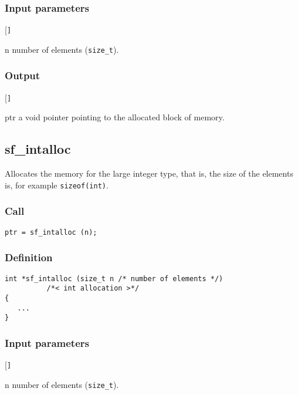 \subsubsection*{Input parameters}
\begin{desclist}{\tt }{\quad}[\tt ]
   \setlength\itemsep{0pt}
   \item[n]  number of elements (\texttt{size\_t}).
\end{desclist}

\subsubsection*{Output}
\begin{desclist}{\tt }{\quad}[\tt ]
   \setlength\itemsep{0pt}
   \item[ptr] a void pointer pointing to the allocated block of memory.
\end{desclist}




\subsection{{sf\_intalloc}}\label{sec:sf_intalloc}
Allocates the memory for  the large integer type, that is,  the size of the elements is, for example \texttt{sizeof(int)}. 

\subsubsection*{Call}
\begin{verbatim}ptr = sf_intalloc (n);\end{verbatim}

\subsubsection*{Definition}
\begin{verbatim}
int *sf_intalloc (size_t n /* number of elements */)
          /*< int allocation >*/  
{
   ...
}
\end{verbatim}

\subsubsection*{Input parameters}
\begin{desclist}{\tt }{\quad}[\tt ]
   \setlength\itemsep{0pt}
   \item[n]	number of elements (\texttt{size\_t}).
\end{desclist}

